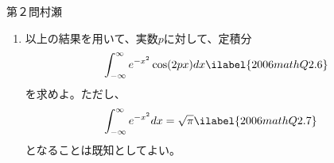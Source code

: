 \begin{question}{第２問}{村瀬}
\begin{enumerate}
\item
  以上の結果を用いて、実数$p$に対して、定積分
  \begin{align}
    \int_{-\infty}^{\infty} e^{-x^2} \cos(2px) dx \ilabel{2006mathQ2.6}
  \end{align}
  を求めよ。ただし、
  \begin{align}
    \int_{-\infty}^{\infty} e^{-x^2} dx &= \sqrt{\pi} \ilabel{2006mathQ2.7}
  \end{align}
  となることは既知としてよい。
\end{enumerate}
\end{question}
